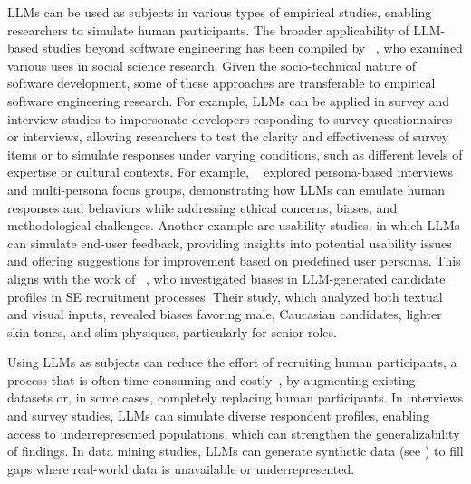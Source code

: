 LLMs can be used as subjects in various types of empirical studies, enabling researchers to simulate human participants.
The broader applicability of LLM-based studies beyond software engineering has been compiled by \citeauthor{DBLP:journals/ipm/XuSRGPLSH24}~\cite{DBLP:journals/ipm/XuSRGPLSH24}, who examined various uses in social science research.
Given the socio-technical nature of software development, some of these approaches are transferable to empirical software engineering research.
For example, LLMs can be applied in survey and interview studies to impersonate developers responding to survey questionnaires or interviews, allowing researchers to test the clarity and effectiveness of survey items or to simulate responses under varying conditions, such as different levels of expertise or cultural contexts.
For example, \citeauthor{DBLP:journals/ase/GerosaTSS24}~\cite{DBLP:journals/ase/GerosaTSS24} explored persona-based interviews and multi-persona focus groups, demonstrating how LLMs can emulate human responses and behaviors while addressing ethical concerns, biases, and methodological challenges.
Another example are usability studies, in which LLMs can simulate end-user feedback, providing insights into potential usability issues and offering suggestions for improvement based on predefined user personas. This aligns with the work of \citeauthor{bano2025doessoftwareengineerlook}~\cite{bano2025doessoftwareengineerlook}, who investigated biases in LLM-generated candidate profiles in SE recruitment processes.
Their study, which analyzed both textual and visual inputs, revealed biases favoring male, Caucasian candidates, lighter skin tones, and slim physiques, particularly for senior roles.


Using LLMs as subjects can reduce the effort of recruiting human participants, a process that is often time-consuming and costly~\cite{DBLP:conf/vl/Madampe0HO24}, by augmenting existing datasets or, in some cases, completely replacing human participants. 
In interviews and survey studies, LLMs can simulate diverse respondent profiles, enabling access to underrepresented populations, which can strengthen the generalizability of findings. 
In data mining studies, LLMs can generate synthetic data (see \synthesis) to fill gaps where real-world data is unavailable or underrepresented.


